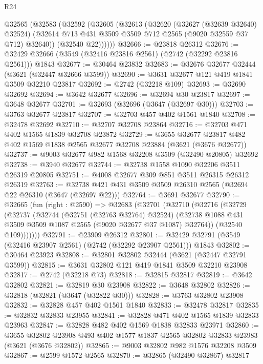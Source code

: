 \begin{lexlean}{R24}
\begin{coremodule}
    @32565
      (@32583
        (@32592
          (@32605
            (@32613
              (@32620
                (@32627 (@32639 @32640) @32524)
                (@32614 @713 @431 @3509 @3509 @712 @2565 (@9020 @32559 @37 @712) @32640))
              (@32540 @22))))))
@32666 := @23818 @26312
@32676 := @32429 @32666 (@3549 (@32416 @23816 @2561) (@2742 (@32292 @23816 @2561))) @1843
@32677 := @30464 @23832
@32683 := @32676 @32677 @32444 (@3621 (@32447 @32666 @3599))
@32690 := @3631 @32677 @121 @419 @1841 @3509 @32210 @23817
@32692 := @2742 (@32218 @109)
@32693 := @32690 @32692
@32694 := @3642 @32677
@32696 := @32694 @30 @23817
@32697 := @3648 @32677
@32701 := @32693 (@32696 (@3647 (@32697 @30)))
@32703 := @3763 @32677 @23817
@32707 := @32703 @457 @402 @1561 @1840
@32708 := @32478 @32692
@32710 := @32707 @32708 @23864
@32716 := @32703 @471 @402 @1565 @1839 @32708 @23872
@32729 := @3655
    @32677
    @23817
    @482
    @402
    @1569
    @1838
    @2565
    @32677
    @32708
    @23884
    (@3621 (@3676 @32677))
@32737 := @9003 @32677 @982 @1568 @32208 @3509 (@32490 @20805) @32692
@32738 := @3940 @32677
@32744 := @32738 @1558 @1090 @32206 @3511 @26319 @20805
@32751 := @4008 @32677 @309 @851 @3511 @26315 @26312 @26319
@32763 := @32738 @421 @431 @3509 @3509 @26310 @2565 (@32694 @22 @26310 (@3647 (@32697 @22)))
@32764 := @3691 @32677
@32790 := @32665
    (fun (right : @2590) =>
    @32683
      (@32701
        (@32710
          (@32716
            (@32729
              (@32737
                (@32744
                  (@32751 (@32763 @32764) @32524)
                  (@32738 @1088 @431 @3509 @3509 @1087 @2565 (@9020 @32677 @37 @1087) @32764))
                (@32540 @109)))))))
@32791 := @23909 @26312
@32801 := @32429 @32791 (@3549 (@32416 @23907 @2561) (@2742 (@32292 @23907 @2561))) @1843
@32802 := @30464 @23923
@32808 := @32801 @32802 @32444 (@3621 (@32447 @32791 @3599))
@32815 := @3631 @32802 @121 @419 @1841 @3509 @32210 @23908
@32817 := @2742 (@32218 @73)
@32818 := @32815 @32817
@32819 := @3642 @32802
@32821 := @32819 @30 @23908
@32822 := @3648 @32802
@32826 := @32818 (@32821 (@3647 (@32822 @30)))
@32828 := @3763 @32802 @23908
@32832 := @32828 @457 @402 @1561 @1840
@32833 := @32478 @32817
@32835 := @32832 @32833 @23955
@32841 := @32828 @471 @402 @1565 @1839 @32833 @23963
@32847 := @32828 @482 @402 @1569 @1838 @32833 @23971
@32860 := @3655
    @32802
    @23908
    @493
    @402
    @1577
    @1837
    @2565
    @32802
    @32833
    @23983
    (@3621 (@3676 @32802))
@32865 := @9003 @32802 @982 @1576 @32208 @3509
@32867 := @2599 @1572 @2565
@32870 := @32865 (@32490 @32867) @32817

\end{coremodule}
\end{lexlean}
